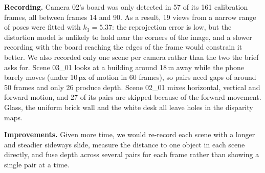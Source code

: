 \documentclass[conference]{assets/latex/IEEEtran}
\begin{document}
\textbf{Recording.} Camera 02's board was only detected in 57 of its 161 calibration frames, all between frames 14 and 90. As a result, 19 views from a narrow range of poses were fitted with $k_3 = 5.37$: the reprojection error is low, but the distortion model is unlikely to hold near the corners of the image, and a slower recording with the board reaching the edges of the frame would constrain it better. We also recorded only one scene per camera rather than the two the brief asks for. Scene 03\_01 looks at a building around 18\,m away while the phone barely moves (under 10\,px of motion in 60 frames), so pairs need gaps of around 50 frames and only 26 produce depth. Scene 02\_01 mixes horizontal, vertical and forward motion, and 27 of its pairs are skipped because of the forward movement. Glass, the uniform brick wall and the white desk all leave holes in the disparity maps.

\textbf{Improvements.} Given more time, we would re-record each scene with a longer and steadier sideways slide, measure the distance to one object in each scene directly, and fuse depth across several pairs for each frame rather than showing a single pair at a time.

\printbibliography
\end{document}
